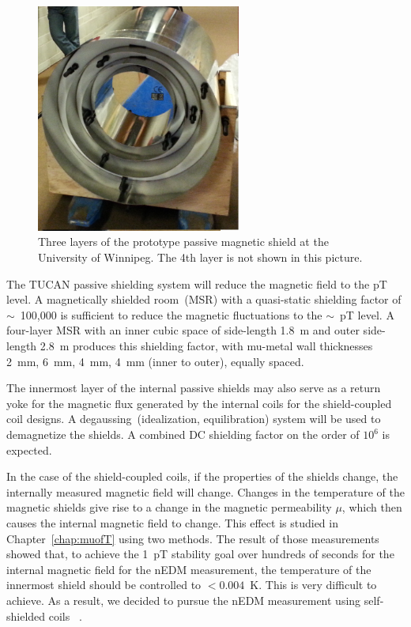 \begin{figure}[h!]
  \centering
  \includegraphics[width=0.6\textwidth]{prototype_shields.png}
  \caption[TUCAN's prototype passive shielding]{Three layers of the
    prototype passive magnetic shield at the University of
    Winnipeg. The 4th layer is not shown in this picture.}
  \label{fig:prototype_shields}
\end{figure}
The TUCAN passive shielding system will reduce the magnetic field to
the pT level.
A magnetically shielded room~(MSR) with a quasi-static shielding
factor of $\sim$~100,000 is sufficient to reduce the magnetic
fluctuations to the $\sim$~pT level. A four-layer MSR with an inner
cubic space of side-length 1.8~m and outer side-length 2.8~m produces
this shielding factor, with mu-metal wall thicknesses 2~mm, 6~mm,
4~mm, 4~mm (inner to outer), equally spaced.


The innermost layer of the internal passive shields may also serve as
a return yoke for the magnetic flux generated by the internal coils
for the shield-coupled coil designs. A degaussing~(idealization,
equilibration) system will be used to demagnetize the shields. A
combined DC shielding factor on the order of $10^6$ is expected.


In the case of the shield-coupled coils, if the properties of the
shields change, the internally measured magnetic field will change.
Changes in the temperature of the magnetic shields give rise to a
change in the magnetic permeability $\mu$, which then causes the
internal magnetic field to change. This effect is studied in
Chapter~\ref{chap:muofT} using two methods. The result of those
measurements showed that, to achieve the 1~pT stability goal over
hundreds of seconds for the internal magnetic field for the nEDM
measurement, the temperature of the innermost shield should be
controlled to $<0.004$~K. This is very difficult to achieve. As a
result, we decided to pursue the nEDM measurement using self-shielded
coils
~\cite{Rosie_thesis}.


